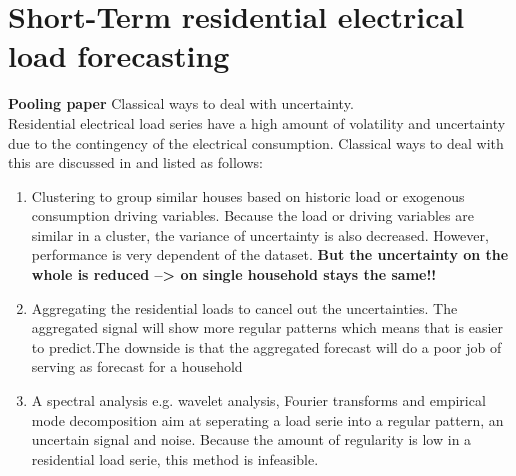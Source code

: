 \section{Short-Term residential electrical load forecasting}
\textbf{Pooling paper}
Classical ways to deal with uncertainty.\\
Residential electrical load series have a high amount of volatility and uncertainty due to the contingency of the electrical consumption. Classical ways to deal with this are discussed in \cite{Shi2018} and listed as follows:
\begin{enumerate}
	\item Clustering to group similar houses based on historic load or exogenous consumption driving variables. Because the load or driving variables are similar in a cluster, the variance of uncertainty is also decreased. However, performance is very dependent of the dataset. \textbf{But the uncertainty on the whole is reduced --> on single household stays the same!!}
	\item Aggregating the residential loads to cancel out the uncertainties. The aggregated signal will show more regular patterns which means that is easier to predict.The downside is that the aggregated forecast will do a poor job of serving as forecast for a household
	\item A spectral analysis e.g. wavelet analysis, Fourier transforms and empirical mode decomposition aim at seperating a load serie into a regular pattern, an uncertain signal and noise. Because the amount of regularity is low in a residential load serie, this method is infeasible.
\end{enumerate}



